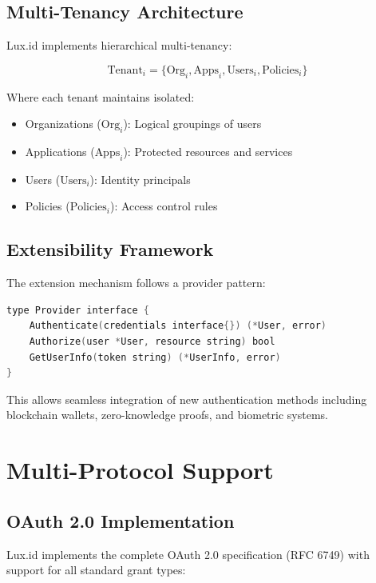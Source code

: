 \documentclass[11pt,a4paper]{article}
\begin{document}
\subsection{Multi-Tenancy Architecture}

Lux.id implements hierarchical multi-tenancy:

\begin{equation}
    \text{Tenant}_i = \{\text{Org}_i, \text{Apps}_i, \text{Users}_i, \text{Policies}_i\}
\end{equation}

Where each tenant maintains isolated:
\begin{itemize}
    \item Organizations ($\text{Org}_i$): Logical groupings of users
    \item Applications ($\text{Apps}_i$): Protected resources and services
    \item Users ($\text{Users}_i$): Identity principals
    \item Policies ($\text{Policies}_i$): Access control rules
\end{itemize}

\subsection{Extensibility Framework}

The extension mechanism follows a provider pattern:

\begin{lstlisting}[language=C]
type Provider interface {
    Authenticate(credentials interface{}) (*User, error)
    Authorize(user *User, resource string) bool
    GetUserInfo(token string) (*UserInfo, error)
}
\end{lstlisting}

This allows seamless integration of new authentication methods including blockchain wallets, zero-knowledge proofs, and biometric systems.

\section{Multi-Protocol Support}

\subsection{OAuth 2.0 Implementation}

Lux.id implements the complete OAuth 2.0 specification (RFC 6749) with support for all standard grant types:
\end{document}

